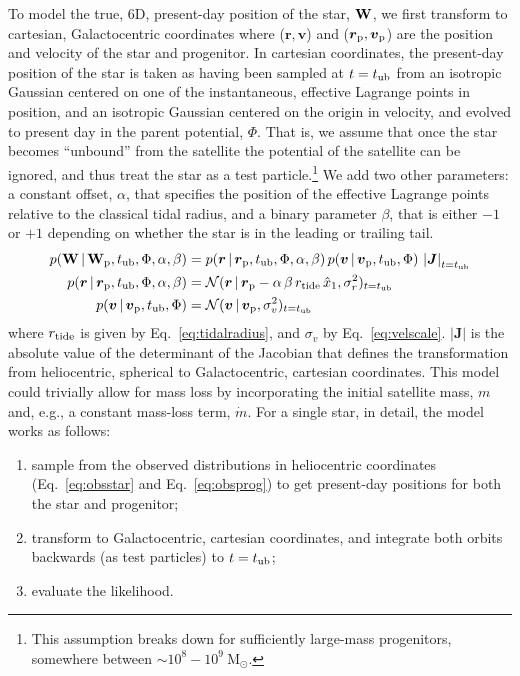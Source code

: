 \documentclass[letterpaper,12pt,preprint]{aastex}
\newcommand{\given}{\,|\,}
\newcommand{\W}{{\bf W}}
\newcommand{\J}{{\boldsymbol J}}
\newcommand{\rtide}{r_{\rm tide}}
\newcommand{\bs}{\boldsymbol}
\newcommand{\sat}{{\rm p}}
\newcommand{\tub}{t_{\rm ub}}
\newcommand{\tailbit}{\beta}
\newcommand{\Loffset}{\alpha}
\begin{document}
To model the true, 6D, present-day position of the star, $\W$, we first transform to cartesian, Galactocentric coordinates where ($\bs{r},\bs{v}$) and ($\bs{r}_\sat,\bs{v}_\sat$) are the position and velocity of the star and progenitor. In cartesian coordinates, the present-day position of the star is taken as having been sampled at $t=\tub$ from an isotropic Gaussian centered on one of the instantaneous, effective Lagrange points in position, and an isotropic Gaussian centered on the origin in velocity, and evolved to present day in the parent potential, $\Phi$. That is, we assume that once the star becomes ``unbound'' from the satellite the potential of the satellite can be ignored, and thus treat the star as a test particle.\footnote{This assumption breaks down for sufficiently large-mass progenitors, somewhere between $\sim10^8-10^9~$M$_\odot$.} We add two other parameters: a constant offset, $\Loffset$, that specifies the position of the effective Lagrange points relative to the classical tidal radius, and a binary parameter $\tailbit$, that is either $-1$ or $+1$ depending on whether the star is in the leading or trailing tail.
\begin{align}
	p(\W \given \W_\sat, \tub, \Phi, \Loffset, \tailbit) &= p(\bs{r} \given \bs{r}_\sat, \tub, \Phi, \Loffset, \tailbit)\,p(\bs{v} \given \bs{v}_\sat, \tub, \Phi)\,\left\vert\J\right\vert_{t=\tub}\\
	p(\bs{r} \given \bs{r}_\sat, \tub, \Phi, \Loffset, \tailbit) &= \mathcal{N}(\bs{r} \given \bs{r}_\sat - \Loffset\,\tailbit\,\rtide\,\hat{x}_1, \sigma^2_r)_{t=\tub}\\
	p(\bs{v} \given \bs{v}_\sat, \tub, \Phi) &= \mathcal{N}(\bs{v} \given \bs{v}_\sat, \sigma^2_v)_{t=\tub}
\end{align}
where $\rtide$ is given by Eq.~\ref{eq:tidalradius}, and $\sigma_v$ by Eq.~\ref{eq:velscale}. $\left\vert\J\right\vert$ is the absolute value of the determinant of the Jacobian that defines the transformation from heliocentric, spherical to Galactocentric, cartesian coordinates. This model could trivially allow for mass loss by incorporating the initial satellite mass, $m$ and, e.g., a constant mass-loss term, $\dot{m}$. For a single star, in detail, the model works as follows:
\begin{enumerate}
	\item sample from the observed distributions in heliocentric coordinates (Eq.~\ref{eq:obsstar} and Eq.~\ref{eq:obsprog}) to get present-day positions for both the star and progenitor;
	\item transform to Galactocentric, cartesian coordinates, and integrate both orbits backwards (as test particles) to $t=t_{\rm ub}$;
	\item evaluate the likelihood.
\end{enumerate}
\end{document}
